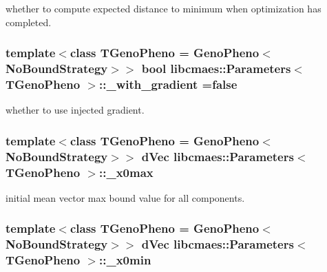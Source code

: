 whether to compute expected distance to minimum when optimization has completed. \hypertarget{classlibcmaes_1_1Parameters_aff76cebbfef51c20398aab8f49a3676a}{
\subsubsection[{\+\_\+with\+\_\+gradient}]{\setlength{\rightskip}{0pt plus 5cm}template$<$class T\+Geno\+Pheno = Geno\+Pheno$<$\+No\+Bound\+Strategy$>$$>$ bool {\bf libcmaes\+::\+Parameters}$<$ T\+Geno\+Pheno $>$\+::\+\_\+with\+\_\+gradient =false\hspace{0.3cm}{\ttfamily [protected]}}}\label{classlibcmaes_1_1Parameters_aff76cebbfef51c20398aab8f49a3676a}
whether to use injected gradient. \hypertarget{classlibcmaes_1_1Parameters_aece9694af9bee78bb13b0994db7ac45e}{
\subsubsection[{\+\_\+x0max}]{\setlength{\rightskip}{0pt plus 5cm}template$<$class T\+Geno\+Pheno = Geno\+Pheno$<$\+No\+Bound\+Strategy$>$$>$ d\+Vec {\bf libcmaes\+::\+Parameters}$<$ T\+Geno\+Pheno $>$\+::\+\_\+x0max\hspace{0.3cm}{\ttfamily [protected]}}}\label{classlibcmaes_1_1Parameters_aece9694af9bee78bb13b0994db7ac45e}
initial mean vector max bound value for all components. \hypertarget{classlibcmaes_1_1Parameters_aa3bb27467698d9cb7fc7e0a83b48800f}{
\subsubsection[{\+\_\+x0min}]{\setlength{\rightskip}{0pt plus 5cm}template$<$class T\+Geno\+Pheno = Geno\+Pheno$<$\+No\+Bound\+Strategy$>$$>$ d\+Vec {\bf libcmaes\+::\+Parameters}$<$ T\+Geno\+Pheno $>$\+::\+\_\+x0min\hspace{0.3cm}{\ttfamily [protected]}}}\label{classlibcmaes_1_1Parameters_aa3bb27467698d9cb7fc7e0a83b48800f}
